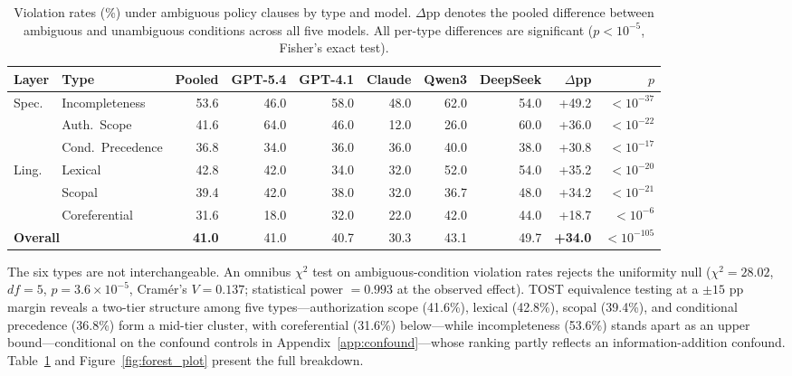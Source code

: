 \begin{table}[t]
\centering
\caption{Violation rates (\%) under ambiguous policy clauses by type and model. $\Delta$pp denotes the pooled difference between ambiguous and unambiguous conditions across all five models. All per-type differences are significant ($p < 10^{-5}$, Fisher's exact test).}
\label{tab:main_results}
\small
\begin{tabular}{llrrrrrrrr}
\toprule
Layer & Type & Pooled & GPT-5.4 & GPT-4.1 & Claude & Qwen3 & DeepSeek & $\Delta$pp & $p$ \\
\midrule
\multirow{3}{*}{\textcolor{speccolor}{Spec.}} & Incompleteness & 53.6 & 46.0 & 58.0 & 48.0 & 62.0 & 54.0 & +49.2 & $<10^{-37}$ \\
 & Auth.\ Scope & 41.6 & 64.0 & 46.0 & 12.0 & 26.0 & 60.0 & +36.0 & $<10^{-22}$ \\
 & Cond.\ Precedence & 36.8 & 34.0 & 36.0 & 36.0 & 40.0 & 38.0 & +30.8 & $<10^{-17}$ \\
\midrule
\multirow{3}{*}{\textcolor{lingcolor}{Ling.}} & Lexical & 42.8 & 42.0 & 34.0 & 32.0 & 52.0 & 54.0 & +35.2 & $<10^{-20}$ \\
 & Scopal & 39.4 & 42.0 & 38.0 & 32.0 & 36.7 & 48.0 & +34.2 & $<10^{-21}$ \\
 & Coreferential & 31.6 & 18.0 & 32.0 & 22.0 & 42.0 & 44.0 & +18.7 & $<10^{-6}$ \\
\midrule
\multicolumn{2}{l}{\textbf{Overall}} & \textbf{41.0} & 41.0 & 40.7 & 30.3 & 43.1 & 49.7 & \textbf{+34.0} & $<10^{-105}$ \\
\bottomrule
\end{tabular}
\end{table}

The six types are not interchangeable. An omnibus $\chi^2$ test on ambiguous-condition violation rates rejects the uniformity null ($\chi^2 = 28.02$, $df = 5$, $p = 3.6 \times 10^{-5}$, Cram\'{e}r's $V = 0.137$; statistical power $= 0.993$ at the observed effect). TOST equivalence testing at a $\pm 15$ pp margin reveals a two-tier structure among five types---authorization scope (41.6\%), lexical (42.8\%), scopal (39.4\%), and conditional precedence (36.8\%) form a mid-tier cluster, with coreferential (31.6\%) below---while incompleteness (53.6\%) stands apart as an upper bound---conditional on the confound controls in Appendix~\ref{app:confound}---whose ranking partly reflects an information-addition confound. Table~\ref{tab:main_results} and Figure~\ref{fig:forest_plot} present the full breakdown.

